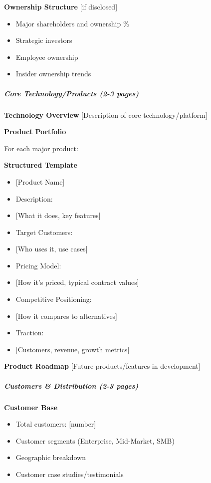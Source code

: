 \documentclass[11pt]{article}
\begin{document}
\textbf{Ownership Structure} [if disclosed]

\begin{itemize}[leftmargin=*,itemsep=2pt,topsep=2pt]
\item {} Major shareholders and ownership \%
\item {} Strategic investors
\item {} Employee ownership
\item {} Insider ownership trends
\end{itemize}

\subparagraph{Core Technology/Products (2-3 pages)}\mbox{}\par

\textbf{Technology Overview} [Description of core technology/platform]


\textbf{Product Portfolio}


For each major product:

\textbf{Structured Template}
\begin{itemize}[leftmargin=*,itemsep=2pt,topsep=2pt]
\item {} [Product Name]
\item {} Description:
\item {} [What it does, key features]
\item {} Target Customers:
\item {} [Who uses it, use cases]
\item {} Pricing Model:
\item {} [How it's priced, typical contract values]
\item {} Competitive Positioning:
\item {} [How it compares to alternatives]
\item {} Traction:
\item {} [Customers, revenue, growth metrics]
\end{itemize}

\textbf{Product Roadmap} [Future products/features in development]


\subparagraph{Customers \& Distribution (2-3 pages)}\mbox{}\par

\textbf{Customer Base}

\begin{itemize}[leftmargin=*,itemsep=2pt,topsep=2pt]
\item {} Total customers: [number]
\item {} Customer segments (Enterprise, Mid-Market, SMB)
\item {} Geographic breakdown
\item {} Customer case studies/testimonials
\end{itemize}
\end{document}
